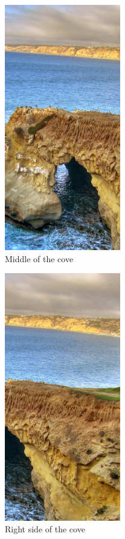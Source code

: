 \documentclass{article}
\begin{document}
\begin{figure}[H]
    \centering
    \includegraphics[width = 0.45\textwidth]{imgs/cove_middle.png}
    \caption{Middle of the cove}
    \label{fig:prob1-amiddle}
\end{figure}

\begin{figure}[H]
    \centering
    \includegraphics[width = 0.45\textwidth]{imgs/cove_right.png}
    \caption{Right side of the cove}
    \label{fig:prob1-aright}
\end{figure}
\end{document}
